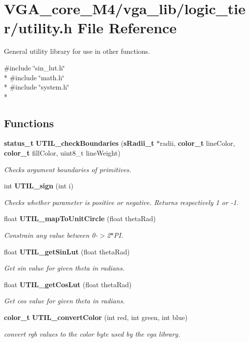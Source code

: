\section{V\+G\+A\+\_\+core\+\_\+\+M4/vga\+\_\+lib/logic\+\_\+tier/utility.h File Reference}
\label{utility_8h}


General utility library for use in other functions.  


{\ttfamily \#include \char`\"{}sin\+\_\+lut.\+h\char`\"{}}\\*
{\ttfamily \#include \char`\"{}math.\+h\char`\"{}}\\*
{\ttfamily \#include \char`\"{}system.\+h\char`\"{}}\\*
\subsection*{Functions}
\begin{DoxyCompactItemize}
\item 
{\bf status\+\_\+t} {\bf U\+T\+I\+L\+\_\+check\+Boundaries} ({\bf s\+Radii\+\_\+t} $\ast$radii, {\bf color\+\_\+t} line\+Color, {\bf color\+\_\+t} fill\+Color, uint8\+\_\+t line\+Weight)
\begin{DoxyCompactList}\small\item\em Checks argument boundaries of primitives. \end{DoxyCompactList}\item 
int {\bf U\+T\+I\+L\+\_\+sign} (int i)
\begin{DoxyCompactList}\small\item\em Checks whether parameter is positive or negative. Returns respectively 1 or -\/1. \end{DoxyCompactList}\item 
float {\bf U\+T\+I\+L\+\_\+map\+To\+Unit\+Circle} (float theta\+Rad)
\begin{DoxyCompactList}\small\item\em Constrain any value between 0-\/$>$2$\ast$\+PI. \end{DoxyCompactList}\item 
float {\bf U\+T\+I\+L\+\_\+get\+Sin\+Lut} (float theta\+Rad)
\begin{DoxyCompactList}\small\item\em Get sin value for given theta in radians. \end{DoxyCompactList}\item 
float {\bf U\+T\+I\+L\+\_\+get\+Cos\+Lut} (float theta\+Rad)
\begin{DoxyCompactList}\small\item\em Get cos value for given theta in radians. \end{DoxyCompactList}\item 
{\bf color\+\_\+t} {\bf U\+T\+I\+L\+\_\+convert\+Color} (int red, int green, int blue)
\begin{DoxyCompactList}\small\item\em convert rgb values to the color byte used by the vga library. \end{DoxyCompactList}\end{DoxyCompactItemize}


